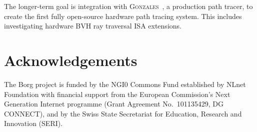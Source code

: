 \documentclass[sigconf,review,natbib=false]{acmart}
\begin{document}
The longer-term goal is integration with \textsc{Gonzales}~\cite{Wendleder2024Gonzales},
a production path tracer, to create the first fully open-source hardware
path tracing system. This includes investigating hardware BVH ray traversal ISA extensions.

\section{Acknowledgements}

The Borg project is funded by the NGI0 Commons Fund established by
NLnet Foundation with financial support from the European Commission's
Next Generation Internet programme
(Grant Agreement No.~101135429, DG CONNECT),
and by the Swiss State Secretariat for Education, Research and
Innovation (SERI).

\printbibliography
\end{document}
